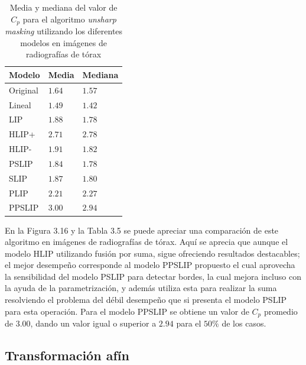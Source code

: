 \begin{table}
	\begin{center}
		\begin{tabular}{|l|l|l|}
			\hline 
			Modelo & Media & Mediana\\
			\hline
			Original & $1.64$ & $1.57$\\
			\hline
			Lineal & $1.49$ & $1.42$\\
			\hline
			LIP & $1.88$ & $1.78$\\
			\hline
			HLIP+ & $2.71$ & $2.78$\\
			\hline
			HLIP- & $1.91$ & $1.82$\\
			\hline
			PSLIP & $1.84$ & $1.78$\\
			\hline
			SLIP & $1.87$ & $1.80$\\
			\hline
			PLIP & $2.21$ & $2.27$\\
			\hline
			PPSLIP & $3.00$ & $2.94$\\
			\hline
		\end{tabular}
		\caption{Media y mediana del valor de $C_p$ para el algoritmo \textit{unsharp masking} utilizando los diferentes modelos en im\'agenes de radiograf\'ias de t\'orax}
	\end{center}
\end{table}

En la Figura 3.16 y la Tabla 3.5 se puede apreciar una comparaci\'on de este algoritmo en im\'agenes de radiograf\'ias de t\'orax. Aqu\'i se aprecia que aunque el modelo HLIP  utilizando fusi\'on por suma, sigue ofreciendo resultados destacables; el mejor desempe\~no corresponde al modelo PPSLIP propuesto el cual aprovecha la sensibilidad del modelo PSLIP para detectar bordes, la cual mejora incluso con la ayuda de la parametrizaci\'on, y adem\'as utiliza esta para realizar la suma resolviendo el problema del d\'ebil desempe\~no que si presenta el modelo PSLIP para esta operaci\'on. Para el modelo PPSLIP se obtiene un valor de $C_p$ promedio de $3.00$, dando un valor igual o superior a $2.94$ para el $50\%$ de los casos.

\subsection{Transformaci\'on af\'in}


